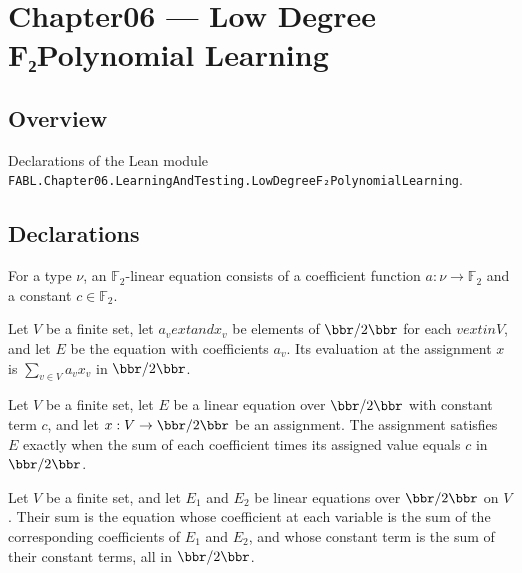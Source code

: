 \chapter{Chapter06 — Low Degree F₂Polynomial Learning}
\section{Overview}

Declarations of the Lean module \texttt{FABL.Chapter06.LearningAndTesting.LowDegreeF₂PolynomialLearning}.

\section{Declarations}

\begin{definition}
\leanok
{}
For a type $\nu$, an $\mathbb{F}_2$-linear equation consists of a coefficient function
$a : \nu \to \mathbb{F}_2$ and a constant $c \in \mathbb{F}_2$.
\end{definition}

\begin{definition}
\leanok
{}
Let $V$ be a finite set, let $a_v	ext{ and }x_v$ be elements of $\bbr/2\bbr$ for each
$v	ext{ in }V$, and let $E$ be the equation with coefficients $a_v$. Its evaluation at
the assignment $x$ is $\sum_{v\in V} a_vx_v$ in $\bbr/2\bbr$.
\end{definition}

\begin{definition}
\leanok
{}
Let $V$ be a finite set, let $E$ be a linear equation over $\bbr/2\bbr$ with constant term
$c$, and let $x:V\to\bbr/2\bbr$ be an assignment. The assignment satisfies $E$ exactly
when the sum of each coefficient times its assigned value equals $c$ in $\bbr/2\bbr$.
\end{definition}

\begin{definition}
\leanok
{}
Let $V$ be a finite set, and let $E_1$ and $E_2$ be linear equations over $\bbr/2\bbr$ on
$V$. Their sum is the equation whose coefficient at each variable is the sum of the
corresponding coefficients of $E_1$ and $E_2$, and whose constant term is the sum of
their constant terms, all in $\bbr/2\bbr$.
\end{definition}

